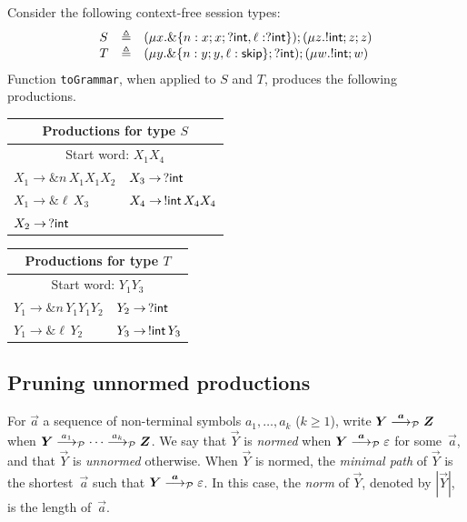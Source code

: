 \begin{example}
\label{ex:productions}
Consider the following context-free session types:
%
\begin{equation*}
\begin{array}{lll}
    S & \triangleq & (\mu x . \&\{n: x;x;?\mathsf{int}, \ell: ?\mathsf{int}\});(\mu z . !\mathsf{int} ; z;z)\\
    T & \triangleq & (\mu y . \&\{n: y;y, \ell: \mathsf{skip}\};?\mathsf{int});(\mu w. !\mathsf{int} ; w)
\end{array}
\end{equation*}
%
Function \lstinline{toGrammar}, when applied to $S$ and $T$, produces
the following productions.
\begin{center}
  \begin{tabular}{l l}
    \multicolumn{2}{c}{Productions for type $S$}\\ \hline
    \multicolumn{2}{c}{Start word: $X_1X_4$}\\
     $X_1 \rightarrow \& n\, X_1 X_1 X_2$ &$X_3 \rightarrow \,? \mathsf{int}$\\
    $X_1 \rightarrow \& \ell\, X_3$ &$X_4 \rightarrow \,!\mathsf{int}\, X_4 X_4$\\
     $X_2 \rightarrow \,? \mathsf{int}$ &\\
  \end{tabular} \qquad
  \begin{tabular}{l l}
    \multicolumn{2}{c}{Productions for type $T$}\\ \hline
    \multicolumn{2}{c}{Start word: $Y_1Y_3$}\\
    $Y_1 \rightarrow \& n\, Y_1 Y_1 Y_2 $&$Y_2 \rightarrow \,? \mathsf{int}$\\
    $Y_1 \rightarrow \& \ell \,Y_2 $&$Y_3 \rightarrow \,!\mathsf{int}\, Y_3$\\
  \end{tabular}
\end{center}
\end{example}

\subsection{Pruning unnormed productions}
\label{subsec:prune}

For $\vec a$ a sequence of non-terminal symbols $a_1,\ldots, a_k$
($k\ge1$), write $\vec Y \LTSderivesP[\vec a] \vec Z$ when
$\vec Y \LTSderivesP[a_1] \cdots \LTSderivesP[a_k] \vec Z$.
%
We say that $\vec Y$ is \emph{normed} when
$\vec Y \LTSderivesP[\vec a] \varepsilon$ for some~$\vec a$, and that
$\vec Y$ is \emph{unnormed} otherwise.
%
When $\vec Y$ is normed, the \emph{minimal path} of $\vec Y$ is the
shortest~$\vec a$ such that $\vec Y \LTSderivesP[\vec a]
\varepsilon$.
%
In this case, the \emph{norm} of $\vec Y$, denoted by $|\vec Y|$, is
the length of~$\vec a$.

